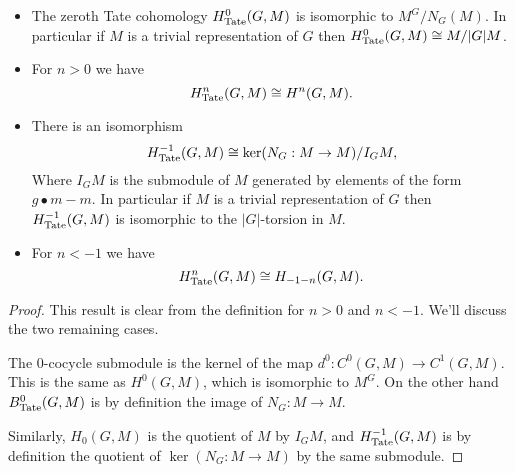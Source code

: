 \begin{lemma}	\label{lem:Tate cohomology is cohomology or homology}
	\leanok
	\begin{itemize}
		\item
		The zeroth Tate cohomology $H^0_{\mathrm{Tate}}(G,M)$ is isomorphic to $M^G / N_G(M)$.
		In particular if $M$ is a trivial representation of $G$ then
		$H^0_{\mathrm{Tate}}(G,M) \cong M / |G|M$.
		\item
		For $n >0 $ we have
		\[
			H^{n}_{\mathrm{Tate}}(G,M) \cong H^{n} (G,M).
		\]
		\item
		There is an isomorphism
		\[
			H^{-1}_{\mathrm{Tate}}(G,M) \cong \ker (N_G : M \to M ) / I_G M,
		\]
		Where $I_GM$ is the submodule of $M$ generated by elements of the form $g \bullet m - m$.
		In particular if $M$ is a trivial representation of $G$ then
		$H^{-1}_{\mathrm{Tate}}(G,M)$ is isomorphic to the $|G|$-torsion in $M$.
		\item
		For $n < -1$ we have
		\[
			H^{n}_{\mathrm{Tate}}(G,M) \cong H_{-1-n} (G,M).
		\]
	\end{itemize}
\end{lemma}

\begin{proof}
	This result is clear from the definition for $n > 0$ and $n < -1$. We'll discuss
	the two remaining cases.

	The $0$-cocycle submodule is the kernel of the map $d^0 : C^0(G,M) \to C^1(G,M)$.
	This is the same as $H^0(G,M)$, which is isomorphic to $M^G$.
	On the other hand $B^0_{\mathrm{Tate}}(G,M)$ is by definition the image of $N_G : M \to M$.

	Similarly, $H_0(G,M)$ is the quotient of $M$ by $I_GM$,
	and $H^{-1}_{\mathrm{Tate}}(G,M)$ is by definition the quotient of $\ker(N_G : M \to M)$
	by the same submodule.
\end{proof}

